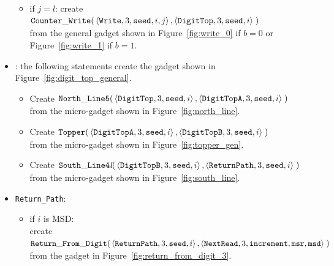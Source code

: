 \begin{itemize}
\begin{itemize}
        \item if $j = l$: create
        $\begin{aligned}[t]
            {\tt Counter\_Write}(&\left\langle {\tt Write}, 3, {\tt seed}, i, j \right\rangle, \left\langle {\tt DigitTop}, 3, {\tt seed}, i \right\rangle \;)
        \end{aligned}$\\from the general gadget shown in Figure~\ref{fig:write_0} if $b = 0$ or Figure~\ref{fig:write_1} if $b = 1$.
    \end{itemize}

    \item {\dtop}: the following statements create the gadget shown in Figure~\ref{fig:digit_top_general}.
    \begin{itemize}
        \item Create
        $\begin{aligned}[t]
            {\tt North\_Line5}(&\left\langle {\tt DigitTop},  3, {\tt seed}, i \right\rangle,
                                \left\langle {\tt DigitTopA}, 3, {\tt seed}, i \right\rangle \;)
        \end{aligned}$\\from the micro-gadget shown in Figure~\ref{fig:north_line}.

        \item Create
        $\begin{aligned}[t]
            {\tt Topper}(&\left\langle {\tt DigitTopA}, 3, {\tt seed}, i \right\rangle,
                          \left\langle {\tt DigitTopB}, 3, {\tt seed}, i \right\rangle \;)
        \end{aligned}$\\from the micro-gadget shown in Figure~\ref{fig:topper_gen}.

        \item Create
        $\begin{aligned}[t]
            {\tt South\_Line4\textit{l}}(&\left\langle {\tt DigitTopB},  3, {\tt seed}, i \right\rangle,
                                          \left\langle {\tt ReturnPath}, 3, {\tt seed}, i \right\rangle \;)
        \end{aligned}$\\from the micro-gadget shown in Figure~\ref{fig:south_line}.
    \end{itemize}

    \item {\tt Return\_Path}:
    \begin{itemize}
        \item if $i$ is MSD: \\
        create
        $\begin{aligned}[t]
            {\tt Return\_From\_Digit}(&\left\langle {\tt ReturnPath}, 3, {\tt seed}, i \right\rangle,
                              \left\langle {\tt NextRead},   3, {\tt increment}, {\tt msr}, {\tt msd}\right\rangle \;)
        \end{aligned}$\\from the gadget in Figure~\ref{fig:return_from_digit_3}.


\end{itemize}
\end{itemize}
